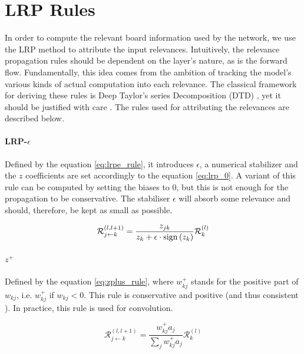 \section{LRP Rules}


In order to compute the relevant board information used by the network, we use the LRP method to attribute the input relevances.
Intuitively, the relevance propagation rules should be dependent on the layer's nature, as is the forward flow. Fundamentally, this idea comes from the ambition of tracking the model's various kinds of actual computation into each relevance. The classical framework for deriving these rules is Deep Taylor's series Decomposition (DTD) \cite{Montavon2015ExplainingNC}, yet it should be justified with care \cite{Sixt2022ARS}. The rules used for attributing the relevances are described below.


\paragraph{LRP-$\epsilon$ \cite{Bach2015OnPE}}
Defined by the equation \ref{eq:lrpe_rule}, it introduces $\epsilon$, a numerical stabilizer and the $z$ coefficients are set accordingly to the equation \ref{eq:lrp_0}. A variant of this rule can be computed by setting the biases to $0$, but this is not enough for the propagation to be conservative. The stabiliser $\epsilon$ will absorb some relevance and should, therefore, be kept as small as possible.


\begin{equation}
\label{eq:lrpe_rule}
\mathcal{R}^{(l,l+1)}_{j\leftarrow k} =\dfrac{z_{jk}}{z_{k}+\epsilon \cdot {\rm sign}\left(z_{k}\right)}\mathcal{R}^{(l)}_k
\end{equation}


\paragraph{$z^+$ \cite{Montavon2015ExplainingNC}}
Defined by the equation \ref{eq:zplus_rule}, where $w_{kj}^+$ stands for the positive part of $w_{kj}$, i.e. $w_{kj}^+$ if $w_{kj}<0$. This rule is conservative and positive (and thus consistent \cite{Montavon2015ExplainingNC}). In practice, this rule is used for convolution.


\begin{equation}
\label{eq:zplus_rule}
\mathcal{R}^{(l,l+1)}_{j\leftarrow k} =\dfrac{w_{kj}^+a_{j}}{\sum_jw_{kj}^+a_{j}} \mathcal{R}^{(l)}_k
\end{equation}
